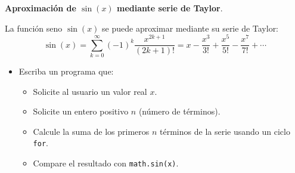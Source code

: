 \item \textbf{Aproximación de \(\sin(x)\) mediante serie de Taylor}.

\begin{tcolorbox}[colback=blue!2!white,colframe=blue!55!black,title={Enunciado}]
La función seno \(\sin(x)\) se puede aproximar mediante su serie de Taylor:
\[
\sin(x) = \sum_{k=0}^{\infty} (-1)^k \frac{x^{2k+1}}{(2k+1)!} = x - \frac{x^3}{3!} + \frac{x^5}{5!} - \frac{x^7}{7!} + \cdots
\]

\begin{itemize}
    \item Escriba un programa que:
    \begin{itemize}
        \item Solicite al usuario un valor real \(x\).
        \item Solicite un entero positivo \(n\) (número de términos).
        \item Calcule la suma de los primeros \(n\) términos de la serie usando un ciclo \texttt{for}.
        \item Compare el resultado con \texttt{math.sin(x)}.
    \end{itemize}
\end{itemize}
\end{tcolorbox}

